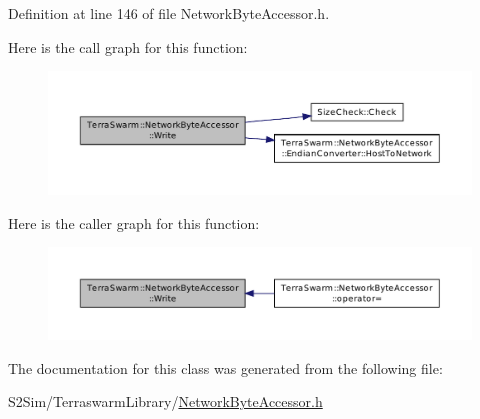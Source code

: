 Definition at line 146 of file Network\-Byte\-Accessor.\-h.



Here is the call graph for this function\-:\nopagebreak
\begin{figure}[H]
\begin{center}
\leavevmode
\includegraphics[width=350pt]{class_terra_swarm_1_1_network_byte_accessor_a7d6e11dd4a5f86e6c036bbcf64bccf25_cgraph}
\end{center}
\end{figure}




Here is the caller graph for this function\-:\nopagebreak
\begin{figure}[H]
\begin{center}
\leavevmode
\includegraphics[width=350pt]{class_terra_swarm_1_1_network_byte_accessor_a7d6e11dd4a5f86e6c036bbcf64bccf25_icgraph}
\end{center}
\end{figure}




The documentation for this class was generated from the following file\-:\begin{DoxyCompactItemize}
\item 
S2\-Sim/\-Terraswarm\-Library/\hyperlink{_network_byte_accessor_8h}{Network\-Byte\-Accessor.\-h}\end{DoxyCompactItemize}
